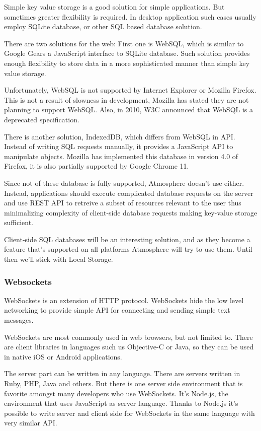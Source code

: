Simple key value storage is a good solution for simple applications. But sometimes greater flexibility is required. In desktop application such cases usually employ SQLite database, or other SQL based database solution. 

There are two solutions for the web: First one is WebSQL, which is similar to Google Gears a JavaScript interface to SQLite database. Such solution provides enough flexibility to store data in a more sophisticated manner than simple key value storage.

Unfortunately, WebSQL is not supported by Internet Explorer or Mozilla Firefox. This is not a result of slowness in development, Mozilla has stated they are not planning to support WebSQL. \citep{mozilla_indexeddb} Also, in 2010, W3C announced that WebSQL is a deprecated specification. \citep{w3c_webdatabase}

There is another solution, IndexedDB, which differs from WebSQL in API. Instead of writing SQL requests manually, it provides a JavaScript API to manipulate objects. Mozilla has implemented this database in version 4.0 of Firefox, it is also partially supported by Google Chrome 11.

Since not of these database is fully supported, Atmosphere doesn’t use either. Instead, applications should execute complicated database requests on the server and use REST API to retreive a subset of resources relevant to the user thus minimalizing complexity of client-side database requests making key-value storage sufficient.

Client-side SQL databases will be an interesting solution, and as they become a feature that’s supported on all platforms Atmosphere will try to use them. Until then we’ll stick with Local Storage.

\subsubsection{Websockets}

WebSockets is an extension of HTTP protocol. WebSockets hide the low level networking to provide simple API for connecting and sending simple text messages. 

WebSockets are most commonly used in web browsers, but not limited to. There are client libraries in languages such us Objective-C or Java, so they can be used in native iOS or Android applications.

The server part can be written in any language. There are servers written in Ruby, PHP, Java and others. But there is one server side environment that is favorite amongst many developers who use WebSockets. It’s Node.js, the environment that uses JavaScript as server language. Thanks to Node.js it’s possible to write server and client side for WebSockets in the same language with very similar API.  


